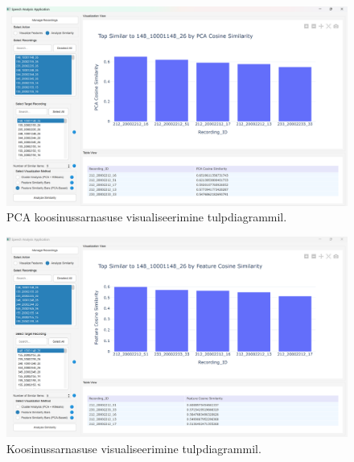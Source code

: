 \begin{figure}[H]
    \centering
    \includegraphics[width=\textwidth]{figures/rakenduse-sarnasus-pca-cosine.png}
    \captionsetup{list=no}
    \caption{PCA koosinussarnasuse visualiseerimine tulpdiagrammil.}
    \label{fig:rakenduse-sarnasus-pca-cosine}
\end{figure}

\begin{figure}[H]
    \centering
    \includegraphics[width=\textwidth]{figures/rakenduse-sarnasus-cosine.png}
    \captionsetup{list=no}
    \caption{Koosinussarnasuse visualiseerimine tulpdiagrammil.}
    \label{fig:rakenduse-sarnasus-cosine}
\end{figure}
